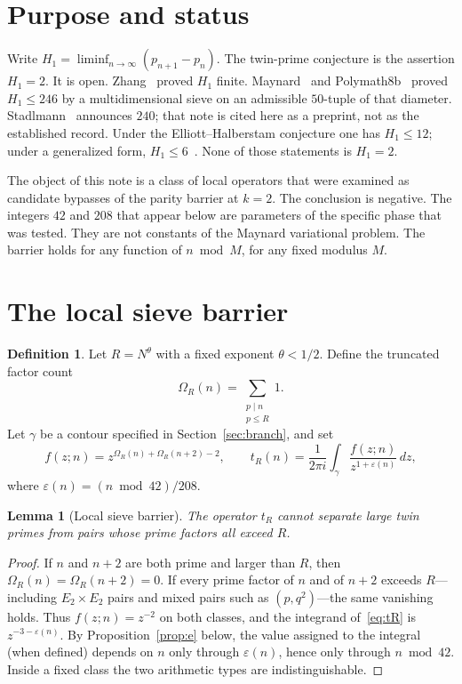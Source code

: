 \documentclass[11pt,a4paper]{article}
\theoremstyle{plain}
\newtheorem{lemma}{Lemma}
\theoremstyle{definition}
\newtheorem{definition}{Definition}
\theoremstyle{plain}
\numberwithin{equation}{section}
\begin{document}
\section{Purpose and status}

Write \(H_1=\liminf_{n\to\infty}(p_{n+1}-p_n)\). The twin-prime conjecture is the assertion \(H_1=2\). It is open. Zhang~\cite{Zhang2013} proved \(H_1\) finite. Maynard~\cite{Maynard2015} and Polymath8b~\cite{Polymath8b} proved \(H_1\le 246\) by a multidimensional sieve on an admissible \(50\)-tuple of that diameter. Stadlmann~\cite{Stadlmann2026} announces \(240\); that note is cited here as a preprint, not as the established record. Under the Elliott--Halberstam conjecture one has \(H_1\le 12\); under a generalized form, \(H_1\le 6\)~\cite{Maynard2015,Polymath8b}. None of those statements is \(H_1=2\).

The object of this note is a class of local operators that were examined as candidate bypasses of the parity barrier at \(k=2\). The conclusion is negative. The integers \(42\) and \(208\) that appear below are parameters of the specific phase that was tested. They are not constants of the Maynard variational problem. The barrier holds for any function of \(n\bmod M\), for any fixed modulus \(M\).

\section{The local sieve barrier}

\begin{definition}
Let \(R=N^{\theta}\) with a fixed exponent \(\theta<1/2\). Define the truncated factor count
\[
\Omega_R(n)=\sum_{\substack{p\mid n\\ p\le R}}1.
\]
Let \(\gamma\) be a contour specified in Section~\ref{sec:branch}, and set
\begin{equation}
\label{eq:tR}
f(z;n)=z^{\Omega_R(n)+\Omega_R(n+2)-2},\qquad
t_R(n)=\frac{1}{2\pi i}\int_{\gamma}\frac{f(z;n)}{z^{1+\varepsilon(n)}}\,dz,
\end{equation}
where \(\varepsilon(n)=(n\bmod 42)/208\).
\end{definition}

\begin{lemma}[Local sieve barrier]
\label{lem:local}
The operator \(t_R\) cannot separate large twin primes from pairs whose prime factors all exceed \(R\).
\end{lemma}

\begin{proof}
If \(n\) and \(n+2\) are both prime and larger than \(R\), then \(\Omega_R(n)=\Omega_R(n+2)=0\). If every prime factor of \(n\) and of \(n+2\) exceeds \(R\)---including \(E_2\times E_2\) pairs and mixed pairs such as \((p,q^2)\)---the same vanishing holds. Thus \(f(z;n)=z^{-2}\) on both classes, and the integrand of~\eqref{eq:tR} is \(z^{-3-\varepsilon(n)}\). By Proposition~\ref{prop:e} below, the value assigned to the integral (when defined) depends on \(n\) only through \(\varepsilon(n)\), hence only through \(n\bmod 42\). Inside a fixed class the two arithmetic types are indistinguishable.
\end{proof}
\end{document}
